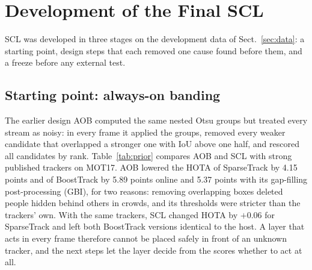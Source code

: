 \documentclass[pdflatex,sn-mathphys-num,iicol]{sn-jnl}
\newcommand{\scl}{SCL}
\newcommand{\aob}{AOB}
\begin{document}
\section{Development of the Final SCL}\label{sec:development}

\scl{} was developed in three stages on the development data of Sect.~\ref{sec:data}: a starting
point, design steps that each removed one cause found before them, and a freeze before any external
test.

\subsection{Starting point: always-on banding}\label{sec:prior}
The earlier design \aob{} computed the same nested Otsu groups but treated every stream as noisy:
in every frame it applied the groups, removed every weaker candidate that overlapped a stronger one
with IoU above one half, and rescored all candidates by rank. Table~\ref{tab:prior} compares \aob{}
and \scl{} with strong published trackers on MOT17. \aob{} lowered the HOTA of SparseTrack by 4.15
points and of BoostTrack by 5.89 points online and 5.37 points with its gap-filling post-processing
(GBI), for two reasons: removing overlapping boxes deleted people hidden behind others in crowds,
and its thresholds were stricter than the trackers' own. With the same trackers, \scl{} changed
HOTA by $+0.06$ for SparseTrack and left both BoostTrack versions identical to the host. A layer
that acts in every frame therefore cannot be placed safely in front of an unknown tracker, and the
next steps let the layer decide from the scores whether to act at all.
\end{document}
